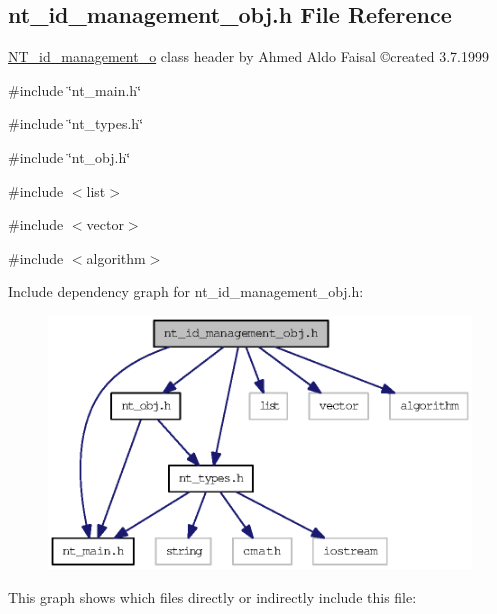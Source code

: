 \subsection{nt\_\-id\_\-management\_\-obj.h File Reference}
\label{nt__id__management__obj_8h}



\begin{DoxyItemize}
\item \hyperlink{class_n_t__id__management__o}{NT\_\-id\_\-management\_\-o} class header by Ahmed Aldo Faisal \copyright created 3.7.1999 
\end{DoxyItemize} 


{\ttfamily \#include \char`\"{}nt\_\-main.h\char`\"{}}\par
{\ttfamily \#include \char`\"{}nt\_\-types.h\char`\"{}}\par
{\ttfamily \#include \char`\"{}nt\_\-obj.h\char`\"{}}\par
{\ttfamily \#include $<$list$>$}\par
{\ttfamily \#include $<$vector$>$}\par
{\ttfamily \#include $<$algorithm$>$}\par
Include dependency graph for nt\_\-id\_\-management\_\-obj.h:
\nopagebreak
\begin{figure}[H]
\begin{center}
\leavevmode
\includegraphics[width=375pt]{nt__id__management__obj_8h__incl}
\end{center}
\end{figure}
This graph shows which files directly or indirectly include this file:
\nopagebreak

